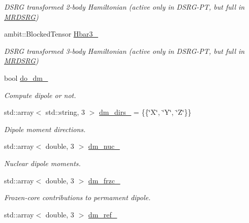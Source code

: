 \begin{DoxyCompactItemize}
\begin{DoxyCompactList}\small\item\em D\+S\+RG transformed 2-\/body Hamiltonian (active only in D\+S\+R\+G-\/\+PT, but full in \mbox{\hyperlink{classforte_1_1_m_r_d_s_r_g}{M\+R\+D\+S\+RG}}) \end{DoxyCompactList}\item 
ambit\+::\+Blocked\+Tensor \mbox{\hyperlink{classforte_1_1_m_a_s_t_e_r___d_s_r_g_a3624d324e16571cccc709f94bafbef05}{Hbar3\+\_\+}}
\begin{DoxyCompactList}\small\item\em D\+S\+RG transformed 3-\/body Hamiltonian (active only in D\+S\+R\+G-\/\+PT, but full in \mbox{\hyperlink{classforte_1_1_m_r_d_s_r_g}{M\+R\+D\+S\+RG}}) \end{DoxyCompactList}\item 
bool \mbox{\hyperlink{classforte_1_1_m_a_s_t_e_r___d_s_r_g_ab047e1ebdd0a9093bbf45be8c02bae2a}{do\+\_\+dm\+\_\+}}
\begin{DoxyCompactList}\small\item\em Compute dipole or not. \end{DoxyCompactList}\item 
std\+::array$<$ std\+::string, 3 $>$ \mbox{\hyperlink{classforte_1_1_m_a_s_t_e_r___d_s_r_g_a4ec22dab63bdb70eebe6b362169725b2}{dm\+\_\+dirs\+\_\+}} = \{\{\char`\"{}X\char`\"{}, \char`\"{}Y\char`\"{}, \char`\"{}Z\char`\"{}\}\}
\begin{DoxyCompactList}\small\item\em Dipole moment directions. \end{DoxyCompactList}\item 
std\+::array$<$ double, 3 $>$ \mbox{\hyperlink{classforte_1_1_m_a_s_t_e_r___d_s_r_g_a4bd25d400c673eabb78189b364738d86}{dm\+\_\+nuc\+\_\+}}
\begin{DoxyCompactList}\small\item\em Nuclear dipole moments. \end{DoxyCompactList}\item 
std\+::array$<$ double, 3 $>$ \mbox{\hyperlink{classforte_1_1_m_a_s_t_e_r___d_s_r_g_a06f27b2436480da21808dd2d958d6a2e}{dm\+\_\+frzc\+\_\+}}
\begin{DoxyCompactList}\small\item\em Frozen-\/core contributions to permament dipole. \end{DoxyCompactList}\item 
std\+::array$<$ double, 3 $>$ \mbox{\hyperlink{classforte_1_1_m_a_s_t_e_r___d_s_r_g_ac95b84a3f736a7e6f185785a8f8acf93}{dm\+\_\+ref\+\_\+}}

\end{DoxyCompactItemize}
